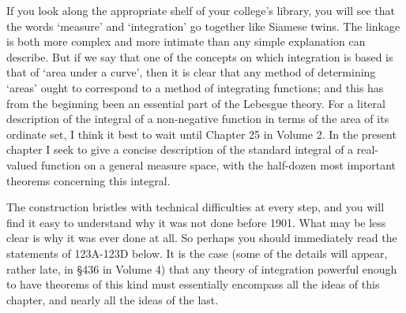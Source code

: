 
\def\chaptername{Integration}


If you look along the appropriate shelf of your college's library, you
will see that the words `measure' and `integration' go together
like Siamese twins.   The linkage is both more complex and more intimate
than any simple explanation can describe.   But if we say that one of
the concepts on which integration is based is that of `area under a
curve', then it is clear that any method of determining `areas' ought
to correspond to a method of integrating functions;  and this has from
the beginning been an essential part of the Lebesgue theory.   For a
literal description of the integral of a non-negative function in terms
of the area of its ordinate set, I think it best to wait until Chapter
25 in Volume 2.
In the present chapter I seek to give a concise description of the
standard integral of a real-valued function on a general measure space,
with the half-dozen most important theorems concerning this integral.

The construction bristles with technical difficulties at every step, and
you will find it easy to understand why it was not done before
1901.   What may be less clear is why it was ever done at all.   So
perhaps you should immediately read the statements of
123A-123D %
below.
It is the case (some of the details will appear, rather late, in \S436
in Volume 4)
that any theory of integration powerful enough to have theorems of this
kind must essentially encompass all the ideas of this chapter, and nearly all the ideas of the last.

\discrpage
